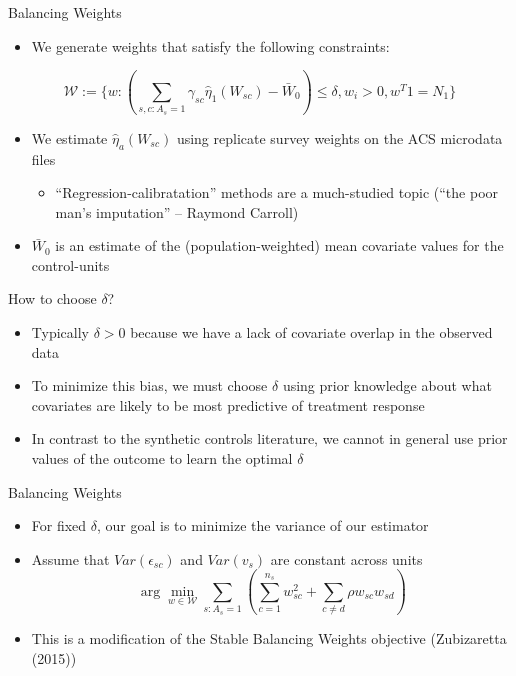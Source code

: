 \documentclass[hyperref={pdfpagelabels=false}]{beamer}
\begin{document}
\begin{frame}{Balancing Weights}
    \begin{itemize}
        \item We generate weights that satisfy the following constraints:
    \end{itemize}
    
    $$
    \mathcal{W}:= \{w: (\sum_{s,c: A_s = 1}\gamma_{sc}\hat{\eta}_1(W_{sc}) - \bar{W}_0) \le \delta, w_i > 0, w^T1 = N_1\}
    $$
    
    \begin{itemize}
        \item We estimate $\hat{\eta}_a(W_{sc})$ using replicate survey weights on the ACS microdata files \bigskip
        \begin{itemize}
            \item ``Regression-calibratation'' methods are a much-studied topic (``the poor man's imputation'' -- Raymond Carroll) \bigskip
        \end{itemize}
        \item $\bar{W}_0$ is an estimate of the (population-weighted) mean covariate values for the control-units
    \end{itemize}
\end{frame}

\begin{frame}{How to choose $\delta$?}
    \begin{itemize}
        \item Typically $\delta > 0$ because we have a lack of covariate overlap in the observed data \bigskip
        \item To minimize this bias, we must choose $\delta$ using prior knowledge about what covariates are likely to be most predictive of treatment response \bigskip
        \item In contrast to the synthetic controls literature, we cannot in general use prior values of the outcome to learn the optimal $\delta$ \bigskip
    \end{itemize}
\end{frame}

\begin{frame}{Balancing Weights}
    \begin{itemize}
        \item For fixed $\delta$, our goal is to minimize the variance of our estimator \bigskip
        \item Assume that $Var(\epsilon_{sc})$ and $Var(v_s)$ are constant across units \bigskip
        $$
        \arg\min_{w \in \mathcal{W}}\sum_{s: A_s = 1}(\sum_{c = 1}^{n_s}w_{sc}^2 + \sum_{c \ne d}\rho w_{sc}w_{sd})
        $$
        \item This is a modification of the Stable Balancing Weights objective (Zubizaretta (2015))
    \end{itemize}
\end{frame}
\end{document}
